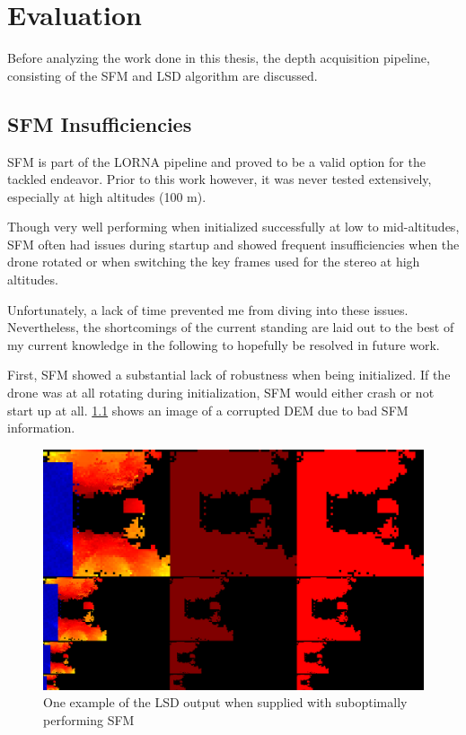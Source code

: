 \chapter{Evaluation}
\label{chapter:evaluation}

Before analyzing the work done in this thesis, the depth acquisition pipeline, consisting of the SFM and LSD algorithm are discussed.

\section{SFM Insufficiencies}\label{subsec:sfm_insufficiencies}
SFM is part of the LORNA pipeline and proved to be a valid option for the tackled endeavor. Prior to this work however, it was never tested extensively, especially at high altitudes (100 m).

Though very well performing when initialized successfully at low to mid-altitudes, SFM often had issues during startup and showed frequent insufficiencies when the drone rotated or when switching the key frames used for the stereo at high altitudes.

Unfortunately, a lack of time prevented me from diving into these issues. Nevertheless, the shortcomings of the current standing are laid out to the best of my current knowledge in the following to hopefully be resolved in future work.

First, SFM showed a substantial lack of robustness when being initialized. If the drone was at all rotating during initialization, SFM would either crash or not start up at all. \cref{fig:SFM_issue_1} shows an image of a corrupted DEM due to bad SFM information.


\begin{figure}[h]
    \centering
    \includegraphics[scale=0.25]{images/evaluation/SFM_issues/Screenshot from 2024-06-19 20-16-22.png}
    \caption{One example of the LSD output when supplied with suboptimally performing SFM}
    \label{fig:SFM_issue_1}
\end{figure} 

